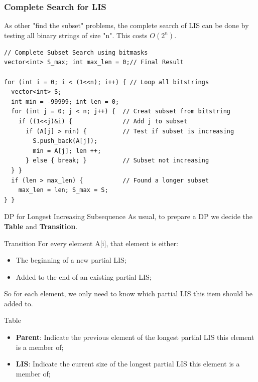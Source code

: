 \begin{frame}[fragile]
  \frametitle{Complete Search for LIS}

  As other "find the subset" problems, the complete search of LIS can be done by testing all binary strings of size "n". This costs $O(2^n)$.
  \smallskip

  \begin{block}{}
    {\smaller
\begin{verbatim}
// Complete Subset Search using bitmasks
vector<int> S_max; int max_len = 0;// Final Result

for (int i = 0; i < (1<<n); i++) { // Loop all bitstrings
  vector<int> S;
  int min = -99999; int len = 0;
  for (int j = 0; j < n; j++) {  // Creat subset from bitstring
    if ((1<<j)&i) {              // Add j to subset
      if (A[j] > min) {          // Test if subset is increasing
        S.push_back(A[j]);
        min = A[j]; len ++;
      } else { break; }          // Subset not increasing
  } }
  if (len > max_len) {           // Found a longer subset
    max_len = len; S_max = S;
} }
\end{verbatim}
    }
  \end{block}
\end{frame}

\begin{frame}{DP for Longest Increasing Subsequence}
  As usual, to prepare a DP we decide the {\bf Table} and {\bf Transition}.

  \begin{block}{Transition}
    For every element A[i], that element is either:
    \begin{itemize}
      \item The beginning of a new partial LIS;
      \item Added to the end of an existing partial LIS;
    \end{itemize}
    So for each element, we only need to know which partial LIS this item should be added to.
  \end{block}

  \begin{exampleblock}{Table}
    \begin{itemize}
      \item {\bf Parent}: Indicate the previous element of the longest partial LIS this element is a member of;
      \item {\bf LIS}: Indicate the current size of the longest partial LIS this element is a member of;
    \end{itemize}
  \end{exampleblock}
\end{frame}

